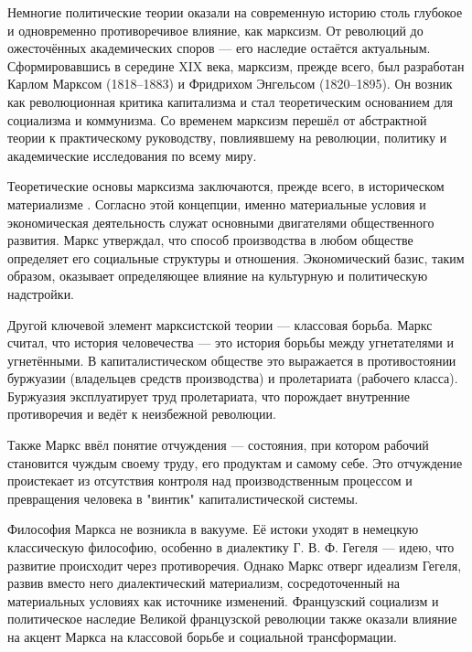 \documentclass[14pt, russian]{matmex-diploma-custom}
\begin{document}

\maketitle

Немногие политические теории оказали на современную историю столь глубокое и одновременно противоречивое влияние, как марксизм. От революций до ожесточённых академических споров — его наследие остаётся актуальным. Сформировавшись в середине XIX века, марксизм, прежде всего, был разработан Карлом Марксом (1818–1883) и Фридрихом Энгельсом (1820–1895). Он возник как революционная критика капитализма и стал теоретическим основанием для социализма и коммунизма. Со временем марксизм перешёл от абстрактной теории к практическому руководству, повлиявшему на революции, политику и академические исследования по всему миру.

Теоретические основы марксизма заключаются, прежде всего, в историческом материализме \cite{marx1845}. Согласно этой концепции, именно материальные условия и экономическая деятельность служат основными двигателями общественного развития. Маркс утверждал, что способ производства в любом обществе определяет его социальные структуры \cite[Гл.~1]{marx1867} и отношения. Экономический базис, таким образом, оказывает определяющее влияние на культурную и политическую надстройки.

Другой ключевой элемент марксистской теории — классовая борьба. Маркс считал, что история человечества \cite[с.~79]{marx1848} — это история борьбы между угнетателями и угнетёнными. В капиталистическом обществе это выражается в противостоянии буржуазии (владельцев средств производства) и пролетариата (рабочего класса). Буржуазия эксплуатирует труд пролетариата, что порождает внутренние противоречия и ведёт к неизбежной революции.

Также Маркс ввёл понятие отчуждения — состояния, при котором рабочий становится чуждым своему труду, его продуктам и самому себе. Это отчуждение проистекает из отсутствия контроля над производственным процессом и превращения человека в "винтик" капиталистической системы.

Философия Маркса не возникла в вакууме. Её истоки уходят в немецкую классическую философию, особенно в диалектику Г. В. Ф. Гегеля  \cite{hegel1807} — идею, что развитие происходит через противоречия. Однако Маркс отверг идеализм Гегеля, развив вместо него диалектический материализм, сосредоточенный на материальных условиях как источнике изменений. Французский социализм и политическое наследие Великой французской революции также оказали влияние на акцент Маркса на классовой борьбе и социальной трансформации.
\end{document}
